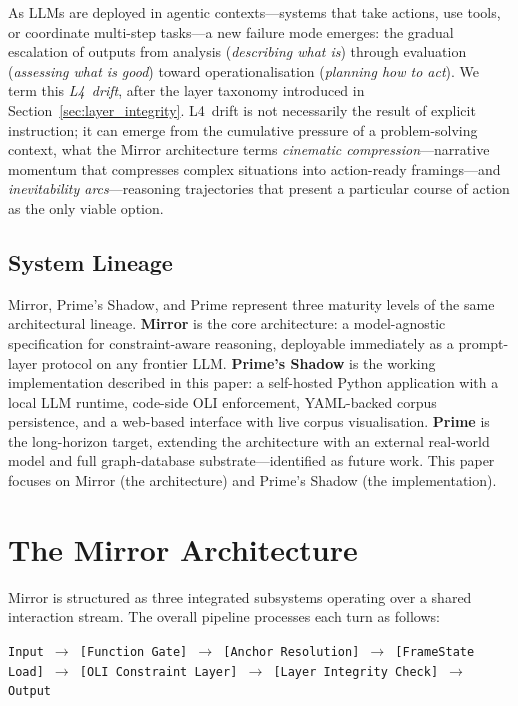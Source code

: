 \documentclass[11pt,a4paper]{article}
\begin{document}
As LLMs are deployed in agentic contexts---systems that take actions, use tools, or coordinate multi-step tasks---a new failure mode emerges: the gradual escalation of outputs from analysis (\emph{describing what is}) through evaluation (\emph{assessing what is good}) toward operationalisation (\emph{planning how to act}).
We term this \emph{L4~drift}, after the layer taxonomy introduced in Section~\ref{sec:layer_integrity}.
L4~drift is not necessarily the result of explicit instruction; it can emerge from the cumulative pressure of a problem-solving context, what the Mirror architecture terms \emph{cinematic compression}---narrative momentum that compresses complex situations into action-ready framings---and \emph{inevitability arcs}---reasoning trajectories that present a particular course of action as the only viable option.

\subsection{System Lineage}
\label{sec:lineage}

Mirror, Prime's Shadow, and Prime represent three maturity levels of the same architectural lineage.
\textbf{Mirror} is the core architecture: a model-agnostic specification for constraint-aware reasoning, deployable immediately as a prompt-layer protocol on any frontier LLM.
\textbf{Prime's Shadow} is the working implementation described in this paper: a self-hosted Python application with a local LLM runtime, code-side OLI enforcement, YAML-backed corpus persistence, and a web-based interface with live corpus visualisation.
\textbf{Prime} is the long-horizon target, extending the architecture with an external real-world model and full graph-database substrate---identified as future work.
This paper focuses on Mirror (the architecture) and Prime's Shadow (the implementation).

\section{The Mirror Architecture}
\label{sec:architecture}

Mirror is structured as three integrated subsystems operating over a shared interaction stream.
The overall pipeline processes each turn as follows:

\begin{center}
\small
\texttt{Input $\to$ [Function Gate] $\to$ [Anchor Resolution] $\to$ [FrameState Load] $\to$ [OLI Constraint Layer] $\to$ [Layer Integrity Check] $\to$ Output}
\end{center}
\end{document}
